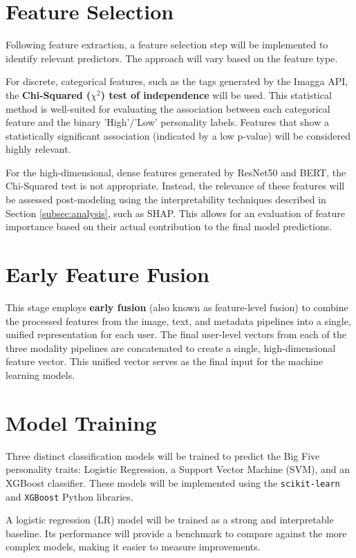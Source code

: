 \section{Feature Selection}
Following feature extraction, a feature selection step will be implemented to identify relevant predictors. The approach will vary based on the feature type.

For discrete, categorical features, such as the tags generated by the Imagga API, the \textbf{Chi-Squared ($\chi^2$) test of independence} will be used. This statistical method is well-suited for evaluating the association between each categorical feature and the binary 'High'/'Low' personality labels. Features that show a statistically significant association (indicated by a low p-value) will be considered highly relevant.

For the high-dimensional, dense features generated by ResNet50 and BERT, the Chi-Squared test is not appropriate. Instead, the relevance of these features will be assessed post-modeling using the interpretability techniques described in Section \ref{subsec:analysis}, such as SHAP. This allows for an evaluation of feature importance based on their actual contribution to the final model predictions.

\section{Early Feature Fusion}
\label{subsec:fusion}
This stage employs \textbf{early fusion} (also known as feature-level fusion) to combine the processed features from the image, text, and metadata pipelines into a single, unified representation for each user. The final user-level vectors from each of the three modality pipelines are concatenated to create a single, high-dimensional feature vector. This unified vector serves as the final input for the machine learning models.

\section{Model Training}
\label{subsec:models}

Three distinct classification models will be trained to predict the Big Five personality traits: Logistic Regression, a Support Vector Machine (SVM), and an XGBoost classifier. These models will be implemented using the \texttt{scikit-learn} \citep{pedregosa2011} and \texttt{XGBoost} \citep{chen2016} Python libraries.

A logistic regression (LR) model will be trained as a strong and interpretable baseline. Its performance will provide a benchmark to compare against the more complex models, making it easier to measure improvements.

